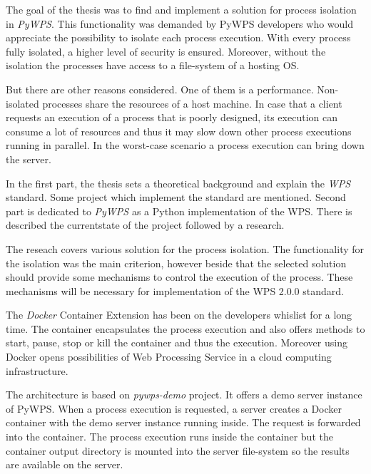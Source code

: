 \newpage
{}

The goal of the thesis was to find and implement a solution for
process isolation in \textit{PyWPS}. This functionality was demanded
by PyWPS developers who would appreciate the possibility to isolate
each process execution. With every process fully isolated, a higher
level of security is ensured. Moreover, without the isolation the
processes have access to a file-system of a hosting OS.

But there are other reasons considered. One of them is a
performance. Non-isolated processes share the resources of a host
machine. In case that a client requests an execution of a process that
is poorly designed, its execution can consume a lot of resources and
thus it may slow down other process executions running in parallel. In
the worst-case scenario a process execution can bring down the server.

In the first part, the thesis sets a theoretical background and
explain the \textit{WPS} standard. Some project which implement the
standard are mentioned. Second part is dedicated to \textit{PyWPS} as
a Python implementation of the WPS. There is described the
currentstate of the project followed by a research.

The reseach covers various solution for the process isolation. The
functionality for the isolation was the main criterion, however beside
that the selected solution should provide some mechanisms to control
the execution of the process. These mechanisms will be necessary for
implementation of the WPS 2.0.0 standard.

The \textit{Docker} Container Extension has been on the developers
whislist for a long time. The container encapsulates the process
execution and also offers methods to start, pause, stop or kill the
container and thus the execution. Moreover using Docker opens
possibilities of Web Processing Service in a cloud computing
infrastructure.

The architecture is based on \textit{pywps-demo} project. It offers a
demo server instance of PyWPS. When a process execution is requested,
a server creates a Docker container with the demo server instance
running inside. The request is forwarded into the container. The
process execution runs inside the container but the container output
directory is mounted into the server file-system so the results are
available on the server.


